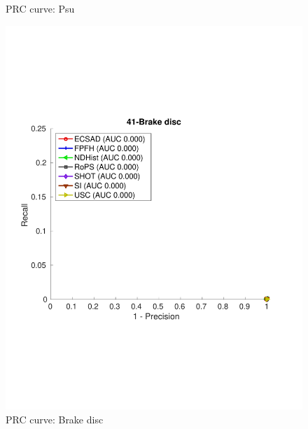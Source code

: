 \documentclass[10pt,twocolumn,letterpaper]{article}
\begin{document}
\begin{figure}[h]
\begin{minipage}[b]{.3\textwidth}
\caption{PRC curve: Psu}\label{fig:noise}
\end{minipage}
\begin{minipage}[b]{.3\textwidth}
\includegraphics[clip, trim=0.7cm 6cm 0.7cm 6cm,width=1.0\linewidth, height= 1.0\linewidth, keepaspectratio]{img/41-Brake_disc_L2_RATIO_zoom.pdf}
\caption{PRC curve: Brake disc}\label{fig:brake disc}
\end{minipage}
\end{figure}
  



\clearpage
{\small


}
\end{document}
